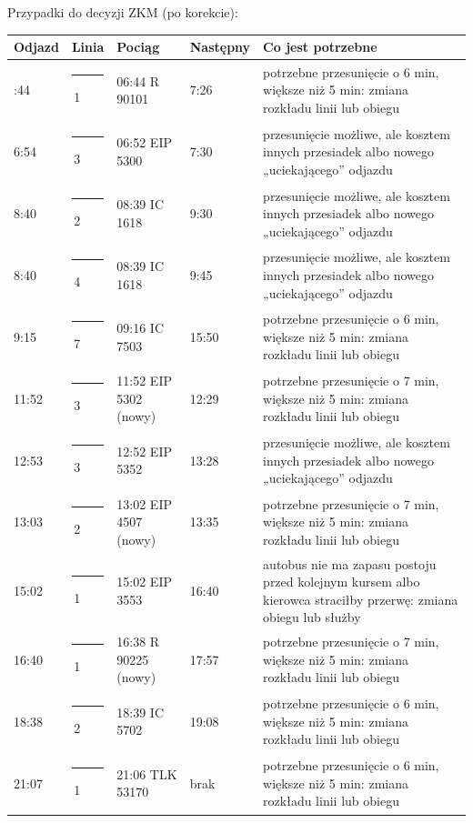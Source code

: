 \documentclass[10pt,a4paper]{article}
\newcommand{\linedot}[1]{\textcolor{#1}{\rule[0.1ex]{0.9ex}{0.9ex}}\,}
\begin{document}
Przypadki do decyzji ZKM (po korekcie):
{\footnotesize
\begin{longtable}{@{}l l l l p{6.4cm}@{}}\toprule
Odjazd & Linia & Pociąg & Następny & Co jest potrzebne \\ \midrule\endhead
\bottomrule\endfoot
6:44 & \linedot{L1}1 & 06:44 R 90101 & 7:26 & potrzebne przesunięcie o 6 min, większe niż 5 min: zmiana rozkładu linii lub obiegu \\
6:54 & \linedot{L3}3 & 06:52 EIP 5300 & 7:30 & przesunięcie możliwe, ale kosztem innych przesiadek albo nowego „uciekającego” odjazdu \\
8:40 & \linedot{L2}2 & 08:39 IC 1618 & 9:30 & przesunięcie możliwe, ale kosztem innych przesiadek albo nowego „uciekającego” odjazdu \\
8:40 & \linedot{L4}4 & 08:39 IC 1618 & 9:45 & przesunięcie możliwe, ale kosztem innych przesiadek albo nowego „uciekającego” odjazdu \\
9:15 & \linedot{L7}7 & 09:16 IC 7503 & 15:50 & potrzebne przesunięcie o 6 min, większe niż 5 min: zmiana rozkładu linii lub obiegu \\
11:52 & \linedot{L3}3 & 11:52 EIP 5302 (nowy) & 12:29 & potrzebne przesunięcie o 7 min, większe niż 5 min: zmiana rozkładu linii lub obiegu \\
12:53 & \linedot{L3}3 & 12:52 EIP 5352 & 13:28 & przesunięcie możliwe, ale kosztem innych przesiadek albo nowego „uciekającego” odjazdu \\
13:03 & \linedot{L2}2 & 13:02 EIP 4507 (nowy) & 13:35 & potrzebne przesunięcie o 7 min, większe niż 5 min: zmiana rozkładu linii lub obiegu \\
15:02 & \linedot{L1}1 & 15:02 EIP 3553 & 16:40 & autobus nie ma zapasu postoju przed kolejnym kursem albo kierowca straciłby przerwę: zmiana obiegu lub służby \\
16:40 & \linedot{L1}1 & 16:38 R 90225 (nowy) & 17:57 & potrzebne przesunięcie o 7 min, większe niż 5 min: zmiana rozkładu linii lub obiegu \\
18:38 & \linedot{L2}2 & 18:39 IC 5702 & 19:08 & potrzebne przesunięcie o 6 min, większe niż 5 min: zmiana rozkładu linii lub obiegu \\
21:07 & \linedot{L1}1 & 21:06 TLK 53170 & brak & potrzebne przesunięcie o 6 min, większe niż 5 min: zmiana rozkładu linii lub obiegu \\
\end{longtable}}
\end{document}
